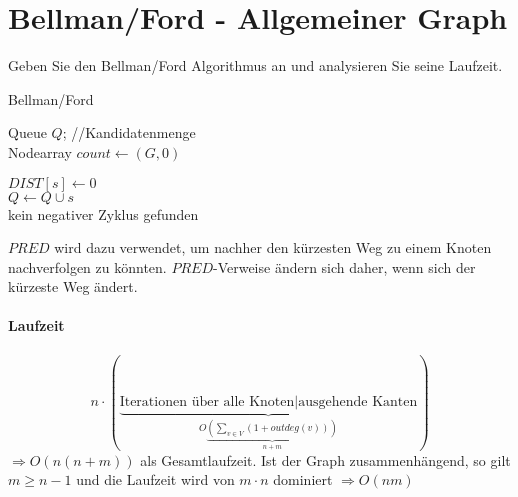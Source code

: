 \section{Bellman/Ford - Allgemeiner Graph}
Geben Sie den Bellman/Ford Algorithmus an und analysieren Sie seine Laufzeit.
\par 
\begin{algorithm}
 \caption{Bellman/Ford}
 
 Queue $Q$; \hspace{5cm} //Kandidatenmenge\\
 Nodearray $count \gets (G, 0)$ \\
 
 
 $DIST[s] \gets 0$\\
 $Q \gets Q \cup s$\\
 \Return kein negativer Zyklus gefunden \\
\end{algorithm}

$PRED$ wird dazu verwendet, um nachher den kürzesten Weg zu einem Knoten nachverfolgen zu könnten. $PRED$-Verweise ändern sich daher, wenn sich der kürzeste Weg ändert.


\paragraph{Laufzeit} 
\[
 n \cdot (\underbrace{\text{Iterationen über alle Knoten} | \text{ausgehende Kanten}}_{O\underbrace{(\sum_{v\in V} (1 + outdeg(v)))}_{n+m}})
\]
$\Rightarrow O(n (n+m))$ als Gesamtlaufzeit. Ist der Graph zusammenhängend, so gilt $m \geq n -1$ und die Laufzeit wird von $m\cdot n$ dominiert $\Rightarrow O(nm)$



